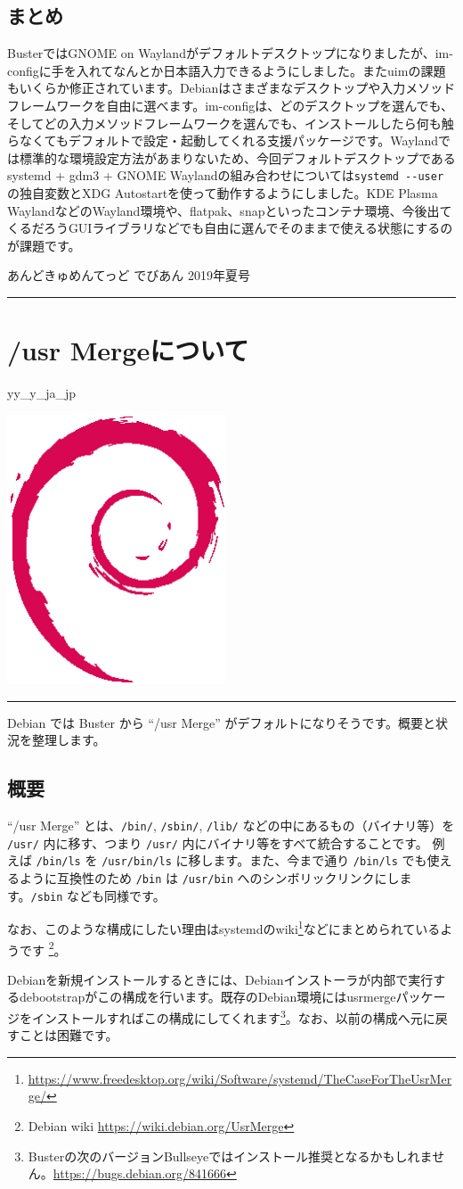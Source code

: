 \documentclass[mingoth,a4paper]{jsarticle}
\renewcommand{\dancersection}[2]{%
\newpage
あんどきゅめんてっど でびあん 2019年夏号
%
\vspace{0.1mm}\\
{\color{dancerdarkblue}\rule{\hsize}{2mm}}

%
%
\begin{minipage}[t]{0.6\hsize}
\color{dancerdarkblue}
\vspace{1cm}
\section{#1}
\hfill{}#2\\
\end{minipage}
\begin{minipage}[t]{0.4\hsize}
\vspace{-2cm}
\hfill{}\includegraphics[height=8cm]{image200502/openlogo-nd.eps}\\
\vspace{-5cm}
\end{minipage}
%
{\color{dancerlightblue}\rule{0.66\hsize}{2mm}}
%
\vspace{2cm}
}
\begin{document}
\subsection{まとめ}

BusterではGNOME on Waylandがデフォルトデスクトップになりましたが、im-configに手を入れてなんとか日本語入力できるようにしました。またuimの課題もいくらか修正されています。Debianはさまざまなデスクトップや入力メソッドフレームワークを自由に選べます。im-configは、どのデスクトップを選んでも、そしてどの入力メソッドフレームワークを選んでも、インストールしたら何も触らなくてもデフォルトで設定・起動してくれる支援パッケージです。Waylandでは標準的な環境設定方法があまりないため、今回デフォルトデスクトップであるsystemd + gdm3 + GNOME Waylandの組み合わせについては\verb|systemd --user|の独自変数とXDG Autostartを使って動作するようにしました。KDE Plasma WaylandなどのWayland環境や、flatpak、snapといったコンテナ環境、今後出てくるだろうGUIライブラリなどでも自由に選んでそのままで使える状態にするのが課題です。

\dancersection{/usr Mergeについて}{yy\_y\_ja\_jp}

Debian では Buster から ``/usr Merge'' がデフォルトになりそうです。概要と状況を整理します。

\subsection{概要}

``/usr Merge'' とは、\verb|/bin/|, \verb|/sbin/|, \verb|/lib/| などの中にあるもの（バイナリ等）を \verb|/usr/| 内に移す、つまり \verb|/usr/| 内にバイナリ等をすべて統合することです。
例えば \verb|/bin/ls| を \verb|/usr/bin/ls| に移します。また、今まで通り \verb|/bin/ls| でも使えるように互換性のため \verb|/bin| は \verb|/usr/bin| へのシンボリックリンクにします。\verb|/sbin| なども同様です。

なお、このような構成にしたい理由はsystemdのwiki\footnote{\url{https://www.freedesktop.org/wiki/Software/systemd/TheCaseForTheUsrMerge/}}などにまとめられているようです
\footnote{Debian wiki \url{https://wiki.debian.org/UsrMerge}}。

Debianを新規インストールするときには、Debianインストーラが内部で実行するdebootstrapがこの構成を行います。既存のDebian環境にはusrmergeパッケージをインストールすればこの構成にしてくれます\footnote{Busterの次のバージョンBullseyeではインストール推奨となるかもしれません。\url{https://bugs.debian.org/841666}}。なお、以前の構成へ元に戻すことは困難です。
\end{document}

